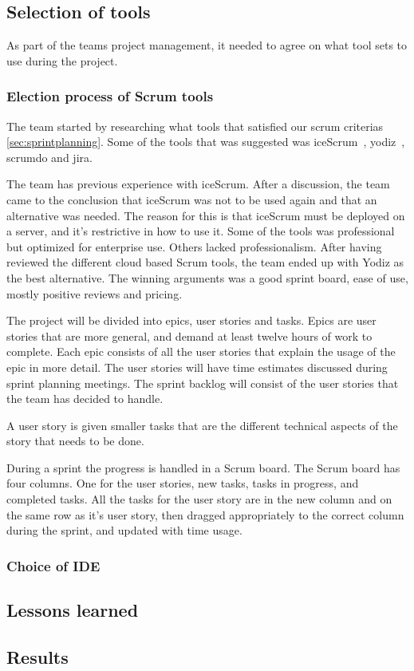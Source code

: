 \subsection{Selection of tools}
As part of the teams project management, it needed to agree on what tool sets to use during the project.
\subsubsection{Election process of Scrum tools}
\label{sec:scrumtools}
The team started by researching what tools that satisfied our scrum criterias \ref{sec:sprintplanning}. Some of the tools that was suggested was iceScrum~\cite{icescrum}, yodiz~\cite{yodiz}, scrumdo and jira.

The team has previous experience with iceScrum. After a discussion, the team came to the conclusion
that iceScrum was not to be used again and that an alternative was needed. The reason for this is that iceScrum must be deployed on a server, and it's restrictive in how to use it.
Some of the tools was professional but optimized for enterprise use. Others lacked professionalism.
After having reviewed the different cloud based Scrum tools, the team ended up with Yodiz as the best alternative. The winning arguments was a
good sprint board, ease of use, mostly positive reviews and pricing.

The project will be divided into epics, user stories and tasks. Epics are user stories that are more general,
and demand at least twelve hours of work to complete. Each epic consists
of all the user stories that explain the usage of the epic in more detail.
The user stories will have time estimates discussed during sprint planning meetings.
The sprint backlog will consist of the user stories that the team has decided to handle.

A user story is given smaller tasks that are the different technical aspects of the story that needs to be done.

During a sprint the progress is handled in a Scrum board. The Scrum board has four columns. One for the user stories, new tasks, tasks in progress, and completed tasks.
All the tasks for the user story are in the new column and on the same row as it's user story, then dragged appropriately to the correct column during the sprint, and updated with time usage.

\subsubsection{Choice of IDE}

\subsection{Lessons learned}


\subsection{Results}
